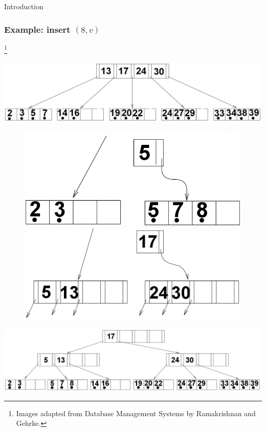 \documentclass{beamer}
\newcommand\blfootnote[1]{%
  \begingroup
  \renewcommand\thefootnote{}\footnote{#1}%
  \addtocounter{footnote}{-1}%
  \endgroup
}
\begin{document}
\begin{section}{Introduction}
    \begin{frame}
      \frametitle{Example: insert $(8,v)$}
      \blfootnote{\tiny Images adapted from Database Management Systems by Ramakrishnan and Gehrke.}
      \vspace{-1em}
      \begin{center}
      \includegraphics[scale=0.17]{B+Tree.png}
      \end{center}
      \pause
      \vspace{-2em}
      \begin{figure}[!ht]
        \centering
        \begin{center}
          \includegraphics[valign=t,scale=0.15]{B+Tree_op1.png}
          \quad
          \pause
          \includegraphics[valign=t,scale=0.15]{B+Tree_op2.png}
        \end{center}
      \end{figure}
      \pause
      \begin{center}
      \includegraphics[scale=0.2]{B+Tree_op3.png}
      \end{center}
    \end{frame}
  \end{section}
\end{document}
